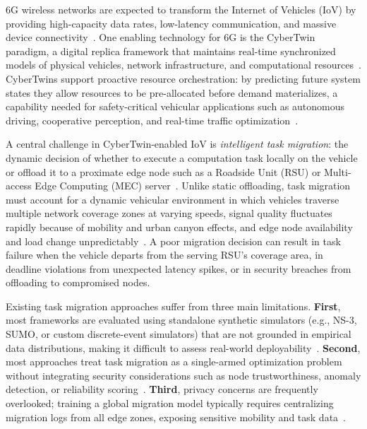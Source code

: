 \documentclass[10pt,letterpaper]{article}
\begin{document}
6G wireless networks are expected to transform the Internet of Vehicles (IoV) by providing high-capacity data rates, low-latency communication, and massive device connectivity~\cite{zhang20206g, wu2020comprehensive}. One enabling technology for 6G is the CyberTwin paradigm, a digital replica framework that maintains real-time synchronized models of physical vehicles, network infrastructure, and computational resources~\cite{liang2022cybertwin, hu2023cybertwin}. CyberTwins support proactive resource orchestration: by predicting future system states they allow resources to be pre-allocated before demand materializes, a capability needed for safety-critical vehicular applications such as autonomous driving, cooperative perception, and real-time traffic optimization~\cite{dai2021survey, zhang2022cybertwin}.

A central challenge in CyberTwin-enabled IoV is \emph{intelligent task migration}: the dynamic decision of whether to execute a computation task locally on the vehicle or offload it to a proximate edge node such as a Roadside Unit (RSU) or Multi-access Edge Computing (MEC) server~\cite{mach2019mobile, huang2021computation}. Unlike static offloading, task migration must account for a dynamic vehicular environment in which vehicles traverse multiple network coverage zones at varying speeds, signal quality fluctuates rapidly because of mobility and urban canyon effects, and edge node availability and load change unpredictably~\cite{zhang2020mobile, abbas2020mobile}. A poor migration decision can result in task failure when the vehicle departs from the serving RSU's coverage area, in deadline violations from unexpected latency spikes, or in security breaches from offloading to compromised nodes.

Existing task migration approaches suffer from three main limitations. \textbf{First}, most frameworks are evaluated using standalone synthetic simulators (e.g., NS-3, SUMO, or custom discrete-event simulators) that are not grounded in empirical data distributions, making it difficult to assess real-world deployability~\cite{hou2018mobile, sun2021toward}. \textbf{Second}, most approaches treat task migration as a single-armed optimization problem without integrating security considerations such as node trustworthiness, anomaly detection, or reliability scoring~\cite{wang2020resource, chen2022intelligent}. \textbf{Third}, privacy concerns are frequently overlooked; training a global migration model typically requires centralizing migration logs from all edge zones, exposing sensitive mobility and task data~\cite{wang2020federated, lim2021federated}.
\end{document}
